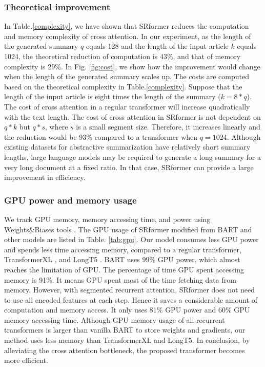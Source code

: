 \documentclass[11pt]{article}
\begin{document}
\subsubsection{Theoretical improvement}
In Table.\ref{complexity}, we have shown that SRformer reduces the computation and memory complexity of cross attention. In our experiment, as the length of the generated summary $q$ equals 128 and the length of the input article $k$ equals 1024, the theoretical reduction of computation is 43\%, and that of memory complexity is 29\%. In Fig. \ref{fig:cost}, we show how the improvement would change when the length of the generated summary scales up. The costs are computed based on the theoretical complexity in Table.\ref{complexity}. Suppose that the length of the input article is eight times the length of the summary ($k=8*q$). The cost of cross attention in a regular transformer will increase quadratically with the text length. The cost of cross attention in SRformer is not dependent on $q*k$ but $q*s$, where $s$ is a small segment size. Therefore, it increases linearly and the reduction would be 93\% compared to a transformer when $q=1024$. Although existing datasets for abstractive summarization have relatively short summary lengths, large language models may be required to generate a long summary for a very long document at a fixed ratio. In that case, SRformer can provide a large improvement in efficiency.

\subsubsection{GPU power and memory usage}
\label{gpupower}
We track GPU memory, memory accessing time, and power using Weights\&Biases tools \cite{wandb}. The GPU usage of SRformer modified from BART and other models are listed in Table. \ref{tab:gpu}. Our model consumes less GPU power and spends less time accessing memory, compared to a regular transformer, TransformerXL \cite{transformerxl}, and LongT5 \cite{longt5}. BART uses 99\% GPU power, which almost reaches the limitation of GPU. The percentage of time GPU spent accessing memory is 91\%. It means GPU spent most of the time fetching data from memory. However, with segmented recurrent attention, SRformer does not need to use all encoded features at each step. Hence it saves a considerable amount of computation and memory access. It only uses 81\% GPU power and 60\% GPU memory accessing time.  Although GPU memory usage of all recurrent transformers is larger than vanilla BART to store weights and gradients, our method uses less memory than TransformerXL and LongT5. In conclusion, by alleviating the cross attention bottleneck, the proposed transformer becomes more efficient.
\end{document}

